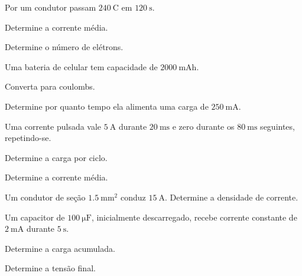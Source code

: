 \blocoaplicacao
\begin{questao}[2]{}

Por um condutor passam $\SI{240}{\coulomb}$ em $\SI{120}{\second}$.
\begin{itensq}
\item Determine a corrente média.
\item Determine o número de elétrons.
\end{itensq}


\end{questao}
\begin{questao}[2]{}

Uma bateria de celular tem capacidade de $\SI{2000}{\milli\ampere\hour}$.
\begin{itensq}
\item Converta para coulombs.
\item Determine por quanto tempo ela alimenta uma carga de
      $\SI{250}{\milli\ampere}$.
\end{itensq}


\end{questao}
\begin{questao}[2]{}

Uma corrente pulsada vale $\SI{5}{\ampere}$ durante
$\SI{20}{\milli\second}$ e zero durante os $\SI{80}{\milli\second}$
seguintes, repetindo-se.
\begin{itensq}
\item Determine a carga por ciclo.
\item Determine a corrente média.
\end{itensq}


\end{questao}
\begin{questao}[2]{}

Um condutor de seção $\SI{1.5}{\milli\meter\squared}$ conduz
$\SI{15}{\ampere}$. Determine a densidade de corrente.


\end{questao}
\begin{questao}[2]{}

Um capacitor de $\SI{100}{\micro\farad}$, inicialmente descarregado, recebe
corrente constante de $\SI{2}{\milli\ampere}$ durante $\SI{5}{\second}$.
\begin{itensq}
\item Determine a carga acumulada.
\item Determine a tensão final.
\end{itensq}


\end{questao}
